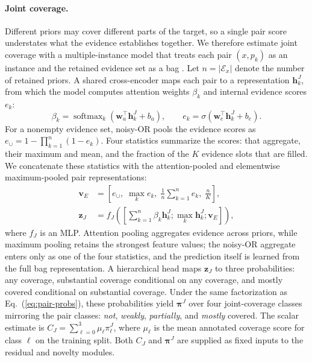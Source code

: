 \paragraph{Joint coverage.}
Different priors may cover different parts of the target, so a single pair
score understates what the evidence establishes together. We therefore
estimate joint coverage with a multiple-instance model that treats each pair
$(x,p_k)$ as an instance and the retained evidence set as a bag
\citep{ilse2018attentionmil}. Let $n=|\mathcal{E}_x|$ denote the number of
retained priors. A shared cross-encoder maps each pair to a representation
$\boldsymbol{h}^{J}_k$, from which the model computes attention weights
$\beta_k$ and internal evidence scores $e_k$:
\begin{equation}
 \beta_k=\operatorname{softmax}_{k}(\boldsymbol{w}_a^\top\boldsymbol{h}^{J}_k+b_a),
 \qquad e_k=\sigma(\boldsymbol{w}_e^\top\boldsymbol{h}^{J}_k+b_e).
\end{equation}
For a nonempty evidence set, noisy-OR pools the evidence scores as
$e_{\cup}=1-\prod_{k=1}^{n}(1-e_k)$. Four statistics summarize the scores:
that aggregate, their maximum and mean, and the fraction of the $K$ evidence
slots that are filled. We concatenate these statistics with the attention-pooled
and elementwise maximum-pooled pair representations:
\begin{align}
 \boldsymbol{v}_E
 &=\left[e_{\cup},\;
          \max_k e_k,\;\frac{1}{n}\sum_{k=1}^{n}e_k,\;\frac{n}{K}\right],
 \\
 \boldsymbol{z}_J
 &=f_J\left(\left[\sum_{k=1}^{n}\beta_k\boldsymbol{h}^{J}_k;
              \max_{k}\boldsymbol{h}^{J}_k;
              \boldsymbol{v}_E\right]\right),
\end{align}
where $f_J$ is an MLP. Attention pooling aggregates evidence across priors,
while maximum pooling retains the strongest feature values; the noisy-OR
aggregate enters only as one of the four statistics, and the prediction itself
is learned from the full bag representation. A hierarchical head maps
$\boldsymbol{z}_J$ to three probabilities: any coverage, substantial coverage
conditional on any coverage, and mostly covered conditional on substantial
coverage. Under the same factorization as
Eq.~(\ref{eq:pair-probs}), these probabilities yield $\boldsymbol{\pi}^{J}$
over four joint-coverage classes mirroring the pair classes: \emph{not},
\emph{weakly}, \emph{partially}, and \emph{mostly} covered. The scalar
estimate is $C_J=\sum_{\ell=0}^{3}\mu_\ell\pi^J_\ell$, where $\mu_\ell$ is the
mean annotated coverage score for class $\ell$ on the training split. Both
$C_J$ and $\boldsymbol{\pi}^{J}$ are supplied as fixed inputs to the residual
and novelty modules.

